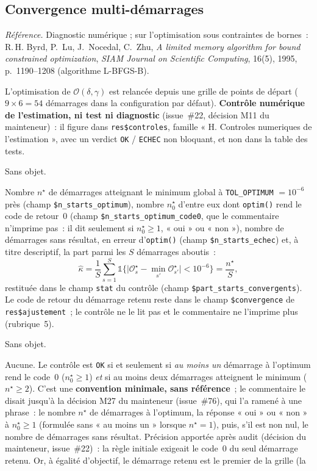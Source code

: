 \documentclass[a4paper,11pt]{article}
\newcommand{\code}[1]{\texttt{\small #1}}
\newcommand{\refl}[1]{{\small\textcolor{maincolor!70!black}{\textit{Référence.} #1}}\par\smallskip}
\newcounter{ficheid}
\newenvironment{fiche}[1]{%
  \stepcounter{ficheid}%
  \phantomsection
  \subsection{#1}%
  \label{fiche:\theficheid}%
}{%
  \end{description}\vspace{0.5em}%
}
\newcommand{\Cadre}{%
  \begin{description}[leftmargin=0pt, style=unboxed, itemsep=3pt, topsep=3pt, parsep=2pt]%
  \item[\textcolor{financeblue}{\textbf{1. Cadre, notations et hypothèses de validité (non testées).}}]}
\newcommand{\Hzero}{\item[\textcolor{financeblue}{\textbf{2. Hypothèse nulle.}}]}
\newcommand{\Stat}{\item[\textcolor{financeblue}{\textbf{3. Statistique de test.}}]}
\newcommand{\Loi}{\item[\textcolor{financeblue}{\textbf{4. Loi sous $H_0$.}}]}
\newcommand{\Pval}{\item[\textcolor{financeblue}{\textbf{5. p-value.}}]}
\begin{document}
\begin{fiche}{Convergence multi-démarrages}
\label{fiche:multi-demarrages}%
\refl{Diagnostic numérique ; sur l'optimisation sous contraintes de bornes~: R.\,H. Byrd, P.~Lu,
J.~Nocedal, C.~Zhu, \emph{A limited memory algorithm for bound constrained optimization},
\emph{SIAM Journal on Scientific Computing}, 16(5), 1995, p.~1190--1208 (algorithme L-BFGS-B).}
\Cadre
L'optimisation de $\mathcal{O}(\delta,\gamma)$ est relancée depuis une grille de points de départ
($9 \times 6 = 54$ démarrages dans la configuration par défaut). \textbf{Contrôle numérique de
l'estimation, ni test ni diagnostic} (issue~\#22, décision M11 du mainteneur)~: il figure dans
\code{res\$controles}, famille « H. Controles numeriques de l'estimation », avec un verdict
\code{OK} / \code{ECHEC} non bloquant, et non dans la table des tests.
\Hzero
Sans objet.
\Stat
Nombre $n^{\star}$ de démarrages atteignant le minimum global à \code{TOL\_OPTIMUM}
$= 10^{-6}$ près (champ \code{\$n\_starts\_optimum}), nombre $n^{\star}_0$ d'entre eux dont \code{optim()} rend le code
de retour~0 (champ \code{\$n\_starts\_optimum\_code0}, que le commentaire n'imprime pas~: il
dit seulement si $n^{\star}_0 \ge 1$, « oui » ou « non »), nombre de démarrages sans résultat, en
erreur d'\code{optim()} (champ \code{\$n\_starts\_echec}) et, à titre descriptif, la part
parmi les $S$ démarrages aboutis~:
\[
  \hat\kappa = \frac{1}{S}\sum_{s=1}^{S} \mathds{1}\Big\{\big|\mathcal{O}_s^{\star} -
  \min_{s'}\mathcal{O}_{s'}^{\star}\big| < 10^{-6}\Big\} = \frac{n^{\star}}{S},
\]
restituée dans le champ \code{stat} du contrôle (champ \code{\$part\_starts\_convergents}).
Le code de retour du démarrage retenu reste dans le champ \code{\$convergence} de
\code{res\$ajustement}~; le contrôle ne le lit pas et le commentaire ne l'imprime plus
(rubrique~5).
\Loi
Sans objet.
\Pval
Aucune. Le contrôle est \code{OK} si et seulement si \emph{au moins un} démarrage à l'optimum
rend le code~0 ($n^{\star}_0 \ge 1$) \emph{et} si au moins deux démarrages atteignent le minimum
($n^{\star} \ge 2$). C'est une \textbf{convention minimale, sans référence}~; le commentaire
le disait jusqu'à la décision M27 du mainteneur (issue~\#76), qui l'a ramené à une phrase~: le
nombre $n^{\star}$ de démarrages à l'optimum, la réponse « oui » ou
« non » à $n^{\star}_0 \ge 1$ (formulée sans « au moins un » lorsque $n^{\star} = 1$), puis, s'il
est non nul, le nombre de démarrages sans résultat. Précision apportée après
audit (décision du mainteneur, issue~\#22)~: la règle initiale exigeait le code~0 du seul
démarrage retenu. Or, à égalité d'objectif, le démarrage retenu est le premier de la grille (la

\end{fiche}
\end{document}
